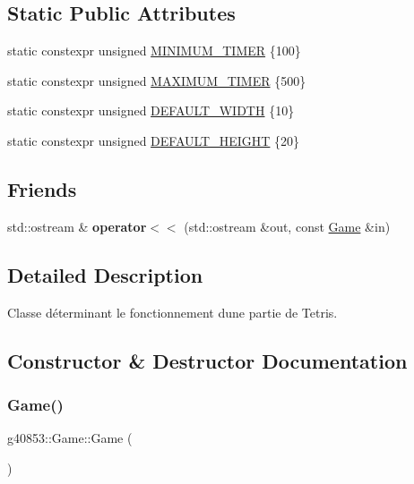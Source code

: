 \subsection*{Static Public Attributes}
\begin{DoxyCompactItemize}
\item 
static constexpr unsigned \hyperlink{classg40853_1_1_game_aa81c1dc7c89987f361e55fdd0117713d}{M\+I\+N\+I\+M\+U\+M\+\_\+\+T\+I\+M\+ER} \{100\}
\item 
static constexpr unsigned \hyperlink{classg40853_1_1_game_a2c93c2b51067295a9cd123e6f695cb6c}{M\+A\+X\+I\+M\+U\+M\+\_\+\+T\+I\+M\+ER} \{500\}
\item 
static constexpr unsigned \hyperlink{classg40853_1_1_game_a2fde8a9055350d16ed2f0a2d39176ed4}{D\+E\+F\+A\+U\+L\+T\+\_\+\+W\+I\+D\+TH} \{10\}
\item 
static constexpr unsigned \hyperlink{classg40853_1_1_game_a33caabe8c3d6fd353176ec7f4b7bda1f}{D\+E\+F\+A\+U\+L\+T\+\_\+\+H\+E\+I\+G\+HT} \{20\}
\end{DoxyCompactItemize}
\subsection*{Friends}
\begin{DoxyCompactItemize}
\item 
\hypertarget{classg40853_1_1_game_abacede938294fd797bbefe49cb3f6978}{}\label{classg40853_1_1_game_abacede938294fd797bbefe49cb3f6978} 
std\+::ostream \& {\bfseries operator$<$$<$} (std\+::ostream \&out, const \hyperlink{classg40853_1_1_game}{Game} \&in)
\end{DoxyCompactItemize}


\subsection{Detailed Description}
Classe déterminant le fonctionnement d\textquotesingle{}une partie de Tetris. 

\subsection{Constructor \& Destructor Documentation}
\hypertarget{classg40853_1_1_game_a14aecdfb4017cab53a2aa357356247fd}{}\label{classg40853_1_1_game_a14aecdfb4017cab53a2aa357356247fd} 
\subsubsection{\texorpdfstring{Game()}{Game()}}
{\footnotesize\ttfamily g40853\+::\+Game\+::\+Game (\begin{DoxyParamCaption}{ }\end{DoxyParamCaption})}



